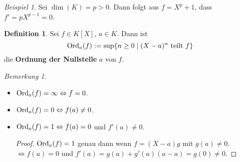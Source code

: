 \documentclass[10pt,a4paper]{article}
\newcommand{\ord}{\ensuremath\operatorname{Ord}}
\newcounter{thm}[section]
\theoremstyle{definition}
\newtheorem{definition}[thm]{Definition}
\theoremstyle{plain}
\theoremstyle{remark}
\newtheorem{bem}[thm]{Bemerkung}
\newtheorem*{exm*}{Beispiel}
\begin{document}
\begin{exm*}
	Sei $\dim(K)=p>0$. Dann folgt aus $f=X^p+1$, dass $f'=pX^{p-1}=0$.
\end{exm*}

\begin{definition}
	Sei $f\in K[X]$, $a\in K$. Dann ist
	\[\ord_a(f):=\sup\{n\geq 0\mid\text{$(X-a)^n$ teilt $f$}\}\]
	die \textbf{Ordnung der Nullstelle} $a$ von $f$.
\end{definition}
\addtocounter{thm}{-1}
\begin{bem}\label{921bem}
	\begin{itemize}
		\item $\ord_a(f)=\infty\Leftrightarrow f=0$.
		\item $\ord_a(f)=0\Leftrightarrow f(a)\neq 0$.
		\item $\ord_a(f)=1\Leftrightarrow f(a)=0$ und $f'(a)\neq 0$.
		\begin{proof}
			$\ord_a(f)=1$ genau dann wenn $f=(X-a)g$ mit $g(a)\neq 0$.\\
			$\Leftrightarrow f(a)=0$ und $f'(a)=g(a)+g'(a)(a-a)=g(0)\neq 0$.
		\end{proof}
	\end{itemize}
\end{bem}
\end{document}
